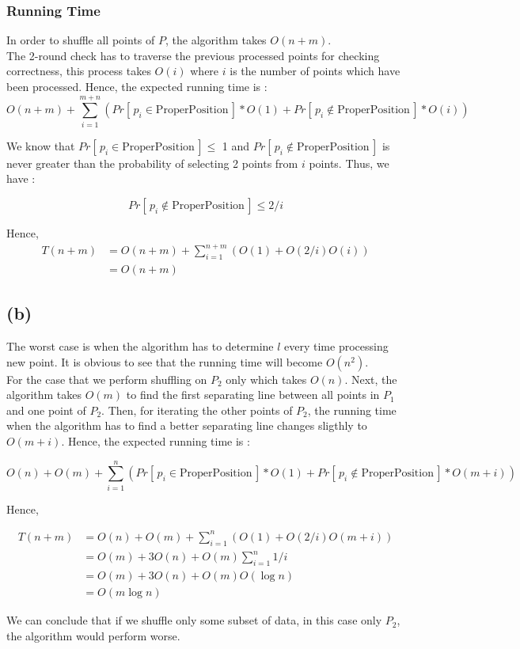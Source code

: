 \subsubsection*{Running Time}
In order to shuffle all points of $P$, the algorithm takes $O(n+m)$.\\

The 2-round check has to traverse the previous processed points for checking correctness, this process takes $O(i)$ where $i$ is the number of points which have been processed. Hence, the expected running time is :
$$
O(n+m) + \sum_{i=1}^{m+n}{ ( Pr[\,p_i \in \text{ProperPosition}\,]*O(1)
    + Pr[\,p_i \not\in \text{ProperPosition}\,]*O(i)
) }
$$

We know that $Pr[\,p_i \in \text{ProperPosition}\,] \le$ 1 and $Pr[\,p_i \not\in \text{ProperPosition}\,]$
is never greater than the probability of selecting 2 points from $i$ points. Thus,
we have :

$$
Pr[\,p_i \not\in \text{ProperPosition}\,] \le 2/i
$$

Hence,
\begin{align*}
T(n+m) &= O(n+m) + \sum_{i=1}^{n+m}( O(1) + O(2/i)O(i) ) \\
&= O(n+m)
\end{align*}

\subsection*{(b)}
The worst case is when the algorithm has to determine $l$ every time processing
new point. It is obvious to see that the running time will become $O(n^2)$. \\

For the case that we perform shuffling on $P_2$ only which takes $O(n)$. Next,
the algorithm takes $O(m)$ to find the first separating line between all points in $P_1$
and one point of $P_2$. Then, for iterating the other points of $P_2$, the running
time when the algorithm has to find a better separating line changes sligthly to
$O(m+i)$. Hence, the expected running time is :

$$
O(n) + O(m) + \sum_{i=1}^{n}{ ( Pr[\,p_i \in \text{ProperPosition}\,]*O(1)
    + Pr[\,p_i \not\in \text{ProperPosition}\,]*O(m+i)
) }
$$

Hence,

\begin{align*}
T(n+m) &= O(n) + O(m) + \sum_{i=1}^{n}(O(1) + O(2/i)O(m+i)) \\
&= O(m) + 3O(n) + O(m)\sum_{i=1}^{n}1/i \\
&= O(m) + 3O(n) + O(m)O(\log{n}) \\
&= O(m\log{n})
\end{align*}

We can conclude that if we shuffle only some subset of data, in this case only $P_2$,
the algorithm would perform worse.
